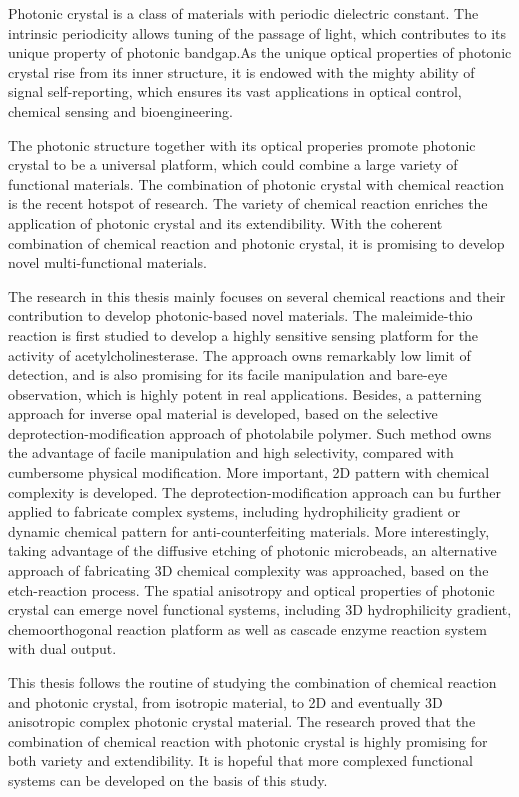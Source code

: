 \begin{eabstract} 
   Photonic crystal is a class of materials with periodic dielectric constant. The intrinsic periodicity allows tuning of the passage of light, which contributes to its unique property of photonic bandgap.As the unique optical properties of photonic crystal rise from its inner structure, it is endowed with the mighty ability of signal self-reporting, which ensures its vast applications in optical control, chemical sensing and bioengineering.

   The photonic structure together with its optical properies promote photonic crystal to be a universal platform, which could combine a large variety of functional materials. The combination of photonic crystal with chemical reaction is the recent hotspot of research. The variety of chemical reaction enriches the application of photonic crystal and its extendibility. With the coherent combination of chemical reaction and photonic crystal, it is promising to develop novel multi-functional materials.

   The research in this thesis mainly focuses on several chemical reactions and their contribution to develop photonic-based novel materials. The maleimide-thio reaction is first studied to develop a highly sensitive sensing platform for the activity of acetylcholinesterase. The approach owns remarkably low limit of detection, and is also promising for its facile manipulation and bare-eye observation, which is highly potent in real applications. Besides, a patterning approach for inverse opal material is developed, based on the selective deprotection-modification approach of photolabile polymer. Such method owns the advantage of facile manipulation and high selectivity, compared with cumbersome physical modification. More important, 2D pattern with chemical complexity is developed. The deprotection-modification approach can bu further applied to fabricate complex systems, including hydrophilicity gradient or dynamic chemical pattern for anti-counterfeiting materials. More interestingly, taking advantage of the diffusive etching of photonic microbeads, an alternative approach of fabricating 3D chemical complexity was approached, based on the etch-reaction process. 
   The spatial anisotropy and optical properties of photonic crystal can emerge novel functional systems, including 3D hydrophilicity gradient, chemoorthogonal reaction platform as well as cascade enzyme reaction system with dual output. 

   This thesis follows the routine of studying the combination of chemical reaction and photonic crystal, from isotropic material, to 2D and eventually 3D anisotropic complex photonic crystal material. The research proved that the combination of chemical reaction with photonic crystal is highly promising for both variety and extendibility. It is hopeful that more complexed functional systems can be developed on the basis of this study.
\end{eabstract}


